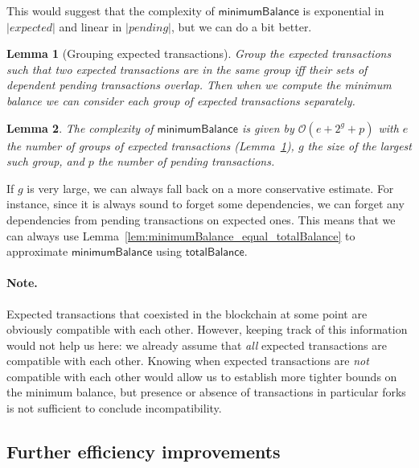 \documentclass{article}
\newcommand{\order}[1]{\mathcal{O}\left(#1\right)}
\newtheorem{lemma}{Lemma}[section] %
\numberwithin{equation}{lemma}
\begin{document}
This would suggest that the complexity of $\mathsf{minimumBalance}$ is
exponential in $|\mathit{expected}|$ and linear in $|\mathit{pending}|$,
but we can do a bit better.

\begin{lemma}[Grouping expected transactions]
Group the expected transactions such that two expected transactions are in
the same group iff their sets of dependent pending transactions overlap.
Then when we compute the minimum balance we can consider each group of
expected transactions separately.
\label{lem:group_expected}
\end{lemma}

\begin{lemma}
The complexity of $\mathsf{minimumBalance}$ is given by
\begin{math}
\order{e + 2^g + p}
\end{math}
with $e$ the number of groups of expected transactions
(Lemma~\ref{lem:group_expected}), $g$ the size of the largest such group,
and $p$ the number of pending transactions.
\label{lem:complexity_minimize}
\end{lemma}

If $g$ is very large, we can always fall back on a more conservative estimate.
For instance, since it is always sound to forget some dependencies, we can
forget any dependencies from pending transactions on expected ones. This means
that we can always use Lemma~\ref{lem:minimumBalance_equal_totalBalance} to
approximate $\mathsf{minimumBalance}$ using $\mathsf{totalBalance}$.

\paragraph{Note.}
Expected transactions that coexisted in the blockchain at some point are
obviously compatible with each other. However, keeping track of this information
would not help us here: we already assume that \emph{all} expected transactions
are compatible with each other. Knowing when expected transactions are
\emph{not} compatible with each other would allow us to establish more tighter
bounds on the minimum balance, but presence or absence of transactions in
particular forks is not sufficient to conclude incompatibility.

\subsection{Further efficiency improvements}
\end{document}
